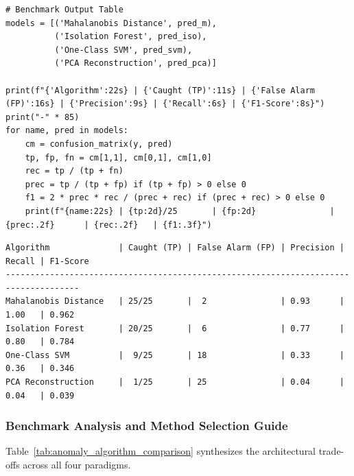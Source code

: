 \begin{lstlisting}[style=pythonstyle, caption={End-to-end comparative anomaly detection benchmark.}, label={lst:anomaly_benchmark}]
# Benchmark Output Table
models = [('Mahalanobis Distance', pred_m), 
          ('Isolation Forest', pred_iso), 
          ('One-Class SVM', pred_svm), 
          ('PCA Reconstruction', pred_pca)]

print(f"{'Algorithm':22s} | {'Caught (TP)':11s} | {'False Alarm (FP)':16s} | {'Precision':9s} | {'Recall':6s} | {'F1-Score':8s}")
print("-" * 85)
for name, pred in models:
    cm = confusion_matrix(y, pred)
    tp, fp, fn = cm[1,1], cm[0,1], cm[1,0]
    rec = tp / (tp + fn)
    prec = tp / (tp + fp) if (tp + fp) > 0 else 0
    f1 = 2 * prec * rec / (prec + rec) if (prec + rec) > 0 else 0
    print(f"{name:22s} | {tp:2d}/25       | {fp:2d}               | {prec:.2f}      | {rec:.2f}   | {f1:.3f}")
\end{lstlisting}

\begin{lstlisting}[style=outputstyle, caption={Benchmark execution output on pump fault dataset.}]
Algorithm              | Caught (TP) | False Alarm (FP) | Precision | Recall | F1-Score
-------------------------------------------------------------------------------------
Mahalanobis Distance   | 25/25       |  2               | 0.93      | 1.00   | 0.962   
Isolation Forest       | 20/25       |  6               | 0.77      | 0.80   | 0.784   
One-Class SVM          |  9/25       | 18               | 0.33      | 0.36   | 0.346   
PCA Reconstruction     |  1/25       | 25               | 0.04      | 0.04   | 0.039   
\end{lstlisting}

\subsubsection{Benchmark Analysis and Method Selection Guide}

Table~\ref{tab:anomaly_algorithm_comparison} synthesizes the architectural trade-offs across all four paradigms.

